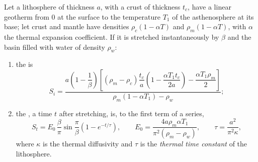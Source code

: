 \begin{proposition}\label{prop:b2:basins-compared:stretching}
Let a lithosphere of thickness $a$, with a crust of thickness $t_c$, have a linear geotherm from
$0$ at the surface to the temperature $T_1$ of the asthenosphere at its base; let crust and mantle
have densities $\rho_c(1 - \alpha T)$ and $\rho_m(1 - \alpha T)$, with $\alpha$ the thermal
expansion coefficient. If it is stretched instantaneously by $\beta$ and the basin filled with
water of density $\rho_w$:
\begin{enumerate}
  \item the  is
  \[
    S_i = \frac{a\left(1 - \dfrac{1}{\beta}\right)\left[(\rho_m - \rho_c)\dfrac{t_c}{a}
          \left(1 - \dfrac{\alpha T_1 t_c}{2a}\right) - \dfrac{\alpha T_1 \rho_m}{2}\right]}
          {\rho_m(1 - \alpha T_1) - \rho_w};
  \]
  \item the , a time $t$ after stretching, is, to the first term of a series,
  \[
    S_t = E_0\,\frac{\beta}{\pi}\sin\frac{\pi}{\beta}\left(1 - e^{-t/\tau}\right),\qquad
    E_0 = \frac{4a\rho_m\alpha T_1}{\pi^2(\rho_m - \rho_w)},\qquad
    \tau = \frac{a^2}{\pi^2\kappa},
  \]
  where $\kappa$ is the thermal diffusivity and $\tau$ is the \emph{thermal time
  constant} of the lithosphere.
\end{enumerate}
\end{proposition}

